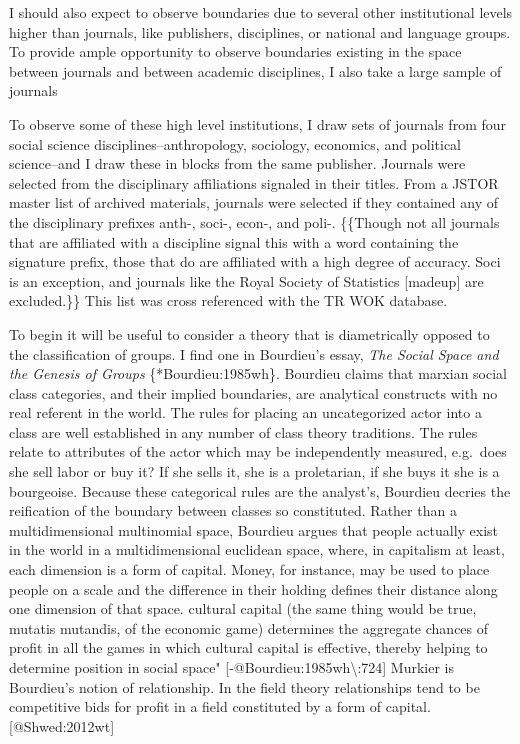 \documentclass[]{article}
\begin{document}
I should also expect to observe boundaries due to several other
institutional levels higher than journals, like publishers, disciplines,
or national and language groups. To provide ample opportunity to observe
boundaries existing in the space between journals and between academic
disciplines, I also take a large sample of journals

To observe some of these high level institutions, I draw sets of
journals from four social science disciplines--anthropology, sociology,
economics, and political science--and I draw these in blocks from the
same publisher. Journals were selected from the disciplinary
affiliations signaled in their titles. From a JSTOR master list of
archived materials, journals were selected if they contained any of the
disciplinary prefixes anth-, soci-, econ-, and poli-. \{\{Though not all
journals that are affiliated with a discipline signal this with a word
containing the signature prefix, those that do are affiliated with a
high degree of accuracy. Soci is an exception, and journals like the
Royal Society of Statistics {[}madeup{]} are excluded.\}\} This list was
cross referenced with the TR WOK database.

To begin it will be useful to consider a theory that is diametrically
opposed to the classification of groups. I find one in Bourdieu's essay,
\emph{The Social Space and the Genesis of Groups} \{*Bourdieu:1985wh\}.
Bourdieu claims that marxian social class categories, and their implied
boundaries, are analytical constructs with no real referent in the
world. The rules for placing an uncategorized actor into a class are
well established in any number of class theory traditions. The rules
relate to attributes of the actor which may be independently measured,
e.g.~does she sell labor or buy it? If she sells it, she is a
proletarian, if she buys it she is a bourgeoise. Because these
categorical rules are the analyst's, Bourdieu decries the reification of
the boundary between classes so constituted. Rather than a
multidimensional multinomial space, Bourdieu argues that people actually
exist in the world in a multidimensional euclidean space, where, in
capitalism at least, each dimension is a form of capital. Money, for
instance, may be used to place people on a scale and the difference in
their holding defines their distance along one dimension of that space.
cultural capital (the same thing would be true, mutatis mutandis, of the
economic game) determines the aggregate chances of profit in all the
games in which cultural capital is effective, thereby helping to
determine position in social space"
{[}-@Bourdieu:1985wh\textbackslash{}:724{]} Murkier is Bourdieu's notion
of relationship. In the field theory relationships tend to be
competitive bids for profit in a field constituted by a form of capital.
{[}@Shwed:2012wt{]}
\end{document}
